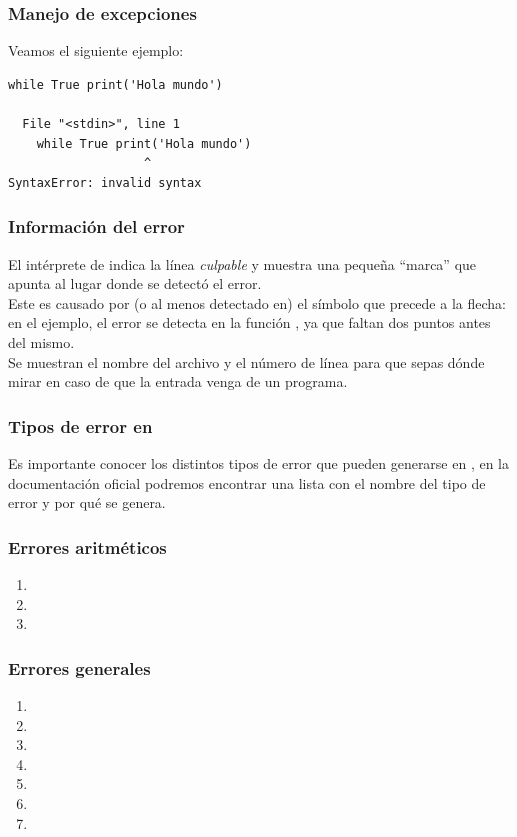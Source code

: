\documentclass[12pt]{beamer}
\begin{document}
\begin{frame}[fragile]
\frametitle{Manejo de excepciones}
Veamos el siguiente ejemplo:
\begin{lstlisting}
while True print('Hola mundo')

  File "<stdin>", line 1
    while True print('Hola mundo')
                   ^
SyntaxError: invalid syntax
\end{lstlisting}
\end{frame}
\begin{frame}
\frametitle{Información del error}
\fontsize{13}{13}\selectfont
El intérprete de \python{} indica la línea \emph{culpable} y muestra una pequeña \enquote{marca} que apunta al lugar donde se detectó el error.
\\
\bigskip
Este es causado por (o al menos detectado en) el símbolo que precede a la flecha: en el ejemplo, el error se detecta en la función , ya que faltan dos puntos \azulfuerte{(:)} antes del mismo.
\\
\bigskip
Se muestran el nombre del archivo y el número de línea para que sepas dónde mirar en caso de que la entrada venga de un programa.    
\end{frame}
\begin{frame}
\frametitle{Tipos de error en \python}
Es importante conocer los distintos tipos de error que pueden generarse en \python, en la documentación oficial podremos encontrar una lista con el nombre del tipo de error y por qué se genera.
\end{frame}
\begin{frame}
\frametitle{Errores aritméticos}
\begin{enumerate}[<+->]
\item {}
\item {}
\item {}
\end{enumerate}
\end{frame}
\begin{frame}
\frametitle{Errores generales}
\begin{enumerate}[<+->]
\item {}
\item {}
\item {}
\item {}
\item {}
\item {}
\item {}
\end{enumerate}
\end{frame}
\end{document}
